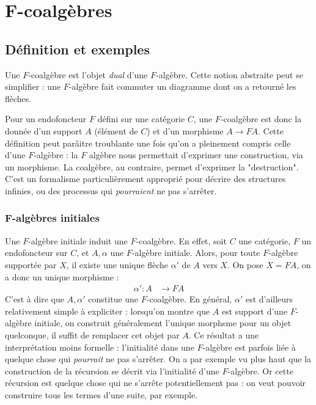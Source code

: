 \documentclass{article}
\begin{document}
\section{F-coalgèbres}

\subsection{Définition et exemples}

Une $F$-coalgèbre est l'objet \textit{dual} d'une $F$-algèbre. Cette notion abstraite peut se simplifier : une $F$-algèbre fait commuter un diagramme dont on a retourné les flèches.

\begin{center}
\end{center}

Pour un endofoncteur $F$ défini sur une catégorie $C$, une $F$-coalgèbre est donc la donnée d'un support $A$ (élément de $C$) et d'un morphisme $A \rightarrow FA$. Cette définition peut parâitre troublante une fois qu'on a pleinement compris celle d'une $F$-algèbre : la $F$ algèbre nous permettait d'exprimer une construction, via un morphisme. La coalgèbre, au contraire, permet d'exprimer la "destruction". C'est un formalisme particulièrement approprié  pour décrire des structures infinies, ou des processus qui \textit{pourraient} ne pas s'arrêter.

\subsubsection{F-algèbres initiales}

Une $F$-algèbre initiale induit une $F$-coalgèbre. En effet, soit $C$ une catégorie, $F$ un endofoncteur sur $C$, et $A, \alpha$ une $F$-algèbre initiale. Alors, pour toute $F$-algèbre supportée par $X$, il existe une unique flèche $ \alpha'$ de $A$ vers $X$. On pose $X = FA$, on a donc un unique morphisme : 
\begin{align*}
    \alpha' : A & \rightarrow FA 
\end{align*}
C'est à dire que $A, \alpha'$ constitue une $F$-coalgèbre. En général, $\alpha'$ est d'ailleurs relativement simple à expliciter : lorsqu'on montre que $A$ est support d'une $F$-algèbre initiale, on construit généralement l'unique morphsme pour un objet quelconque, il suffit de remplacer cet objet par $A$.
Ce résultat a une interprétation moins formelle : l'initialité dans une $F$-algèbre est parfois liée à quelque chose qui \textit{pourrait} ne pas s'arrêter. On a par exemple vu plus haut que la construction de la récursion se décrit via l'initialité d'une $F$-algèbre. Or cette récursion est quelque chose qui ne s'arrête potentiellement pas : on veut pouvoir construire tous les termes d'une suite, par exemple. 
\end{document}
